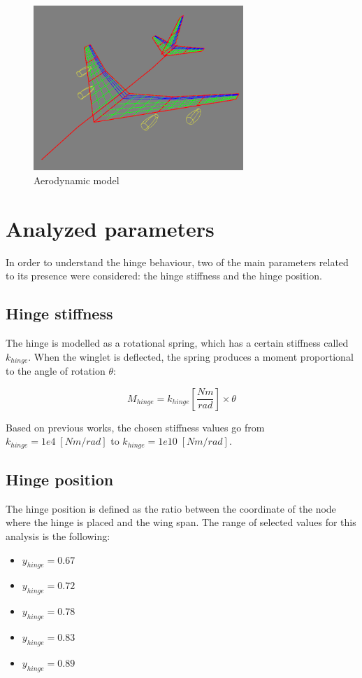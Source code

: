 \documentclass[conference]{IEEEtran}
\newlength\figureheight
\newlength\figurewidth
\begin{document}
\begin{figure}[htp]
  \centering
  \setlength\figureheight{5cm}
  \setlength\figurewidth{7cm}
  \includegraphics[width=225pt]{images/AeroModel.png}
  \caption{Aerodynamic model}
  \label{fig:AeroModel}
\end{figure}


\section{Analyzed parameters}

In order to understand the hinge behaviour, two of the main parameters related to its presence were considered: the hinge stiffness and the hinge position.

\subsection{Hinge stiffness}
The hinge is modelled as a rotational spring, which has a certain stiffness called $k_{hinge}$. When the winglet is deflected, the spring produces a moment proportional to the angle of rotation $\theta$:

\begin{equation}
    M_{hinge} = k_{hinge}[\frac{Nm}{rad}] \times \theta
\end{equation}

Based on previous works, the chosen stiffness values go from $k_{hinge} = 1e4 \;[Nm/rad]$ to $k_{hinge} = 1e10 \;[Nm/rad]$.

\subsection{Hinge position}
The hinge position is defined as the ratio between the coordinate of the node where the hinge is placed and the wing span. The range of  selected values for this analysis is the following:

\begin{itemize}
    \item $y_{hinge} = 0.67$
    \item $y_{hinge} = 0.72$
    \item $y_{hinge} = 0.78$
    \item $y_{hinge} = 0.83$
    \item $y_{hinge} = 0.89$
\end{itemize}
\end{document}
